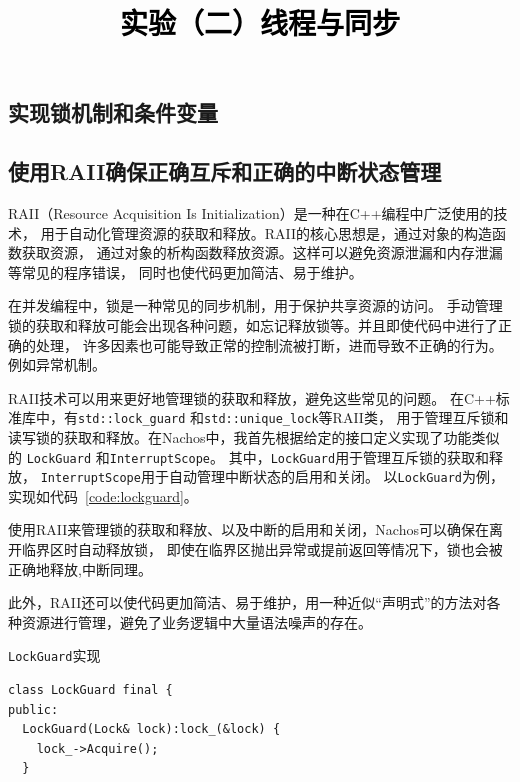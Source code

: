 \documentclass[a4paper,twoside]{article}
\newcommand{\PaperTitle}{实验（二）线程与同步}  %
\begin{document}
\newpage

\title{
	\Large{\textcolor{black}{\PaperTitle}}
}

\maketitle
	
\tableofcontents
 
\newpage
\setcounter{page}{1}

\begin{spacing}{1.2}

\section{实现锁机制和条件变量}

\subsection{使用RAII确保正确互斥和正确的中断状态管理}

RAII（Resource Acquisition Is Initialization）是一种在C++编程中广泛使用的技术，
用于自动化管理资源的获取和释放。RAII的核心思想是，通过对象的构造函数获取资源，
通过对象的析构函数释放资源。这样可以避免资源泄漏和内存泄漏等常见的程序错误，
同时也使代码更加简洁、易于维护。

在并发编程中，锁是一种常见的同步机制，用于保护共享资源的访问。
手动管理锁的获取和释放可能会出现各种问题，如忘记释放锁等。并且即使代码中进行了正确的处理，
许多因素也可能导致正常的控制流被打断，进而导致不正确的行为。例如异常机制。

RAII技术可以用来更好地管理锁的获取和释放，避免这些常见的问题。
在C++标准库中，有\texttt{std::lock\_guard}
和\texttt{std::unique\_lock}等RAII类，
用于管理互斥锁和读写锁的获取和释放。在Nachos中，我首先根据给定的接口定义实现了功能类似的
\texttt{LockGuard}
和\texttt{InterruptScope}。
其中，\texttt{LockGuard}用于管理互斥锁的获取和释放，
\texttt{InterruptScope}用于自动管理中断状态的启用和关闭。
以\texttt{LockGuard}为例，实现如代码~\ref{code:lockguard}。

使用RAII来管理锁的获取和释放、以及中断的启用和关闭，Nachos可以确保在离开临界区时自动释放锁，
即使在临界区抛出异常或提前返回等情况下，锁也会被正确地释放,中断同理。

此外，RAII还可以使代码更加简洁、易于维护，用一种近似“声明式”的方法对各种资源进行管理，避免了业务逻辑中大量语法噪声的存在。

\begin{listing}[htb]
	\caption{\texttt{LockGuard}实现}
	\label{code:lockguard}
	\begin{verbatim}
class LockGuard final {
public:
  LockGuard(Lock& lock):lock_(&lock) {
    lock_->Acquire();
  }
  

\end{verbatim}
\end{listing}
\end{spacing}
\end{document}
